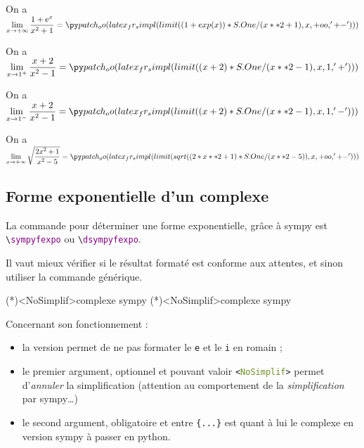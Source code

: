 \documentclass[french,a4paper,11pt]{article}
\newcommand\Cle[1]{{\bfseries\sffamily\textlangle #1\textrangle}}
\begin{document}
\begin{bloctext}
On a $\lim\limits_{x \to +\infty} \dfrac{1+\e^x}{x^2+1} = \sympylim{(1+exp(x))/(x**2+1)}{+oo}$
\end{bloctext}

\begin{bloctext}
On a $\lim\limits_{x \to 1^+} \dfrac{x+2}{x^2-1} = \sympylim{(x+2)/(x**2-1)}{1}[d]$

On a $\lim\limits_{x \to 1^-} \dfrac{x+2}{x^2-1} = \sympylim{(x+2)/(x**2-1)}{1}[g]$
\end{bloctext}

\begin{bloctext}
On a $\lim\limits_{x \to +\infty} \sqrt{\dfrac{2x^2+1}{x^2-5}} = \sympylim{sqrt((2*x**2+1)/(x**2-5))}{+oo}$
\end{bloctext}

\subsection{Forme exponentielle d'un complexe}

\begin{cautionblock}
La commande pour déterminer une forme exponentielle, grâce à \textsf{sympy} est \texttt{\textbackslash \textcolor{purple}{sympyfexpo}} ou \texttt{\textbackslash \textcolor{purple}{dsympyfexpo}}.

Il vaut mieux vérifier si le résultat formaté est conforme aux attentes, et sinon utiliser la commande générique.
\end{cautionblock}

\begin{bloctext}
\sympyfexpo(*)<NoSimplif>{complexe sympy}
\dsympyfexpo(*)<NoSimplif>{complexe sympy}
\end{bloctext}

\begin{tipblock}
Concernant son fonctionnement :

\begin{itemize}
	\item la version \Cle{*} permet de ne pas formater le \texttt{e} et le \texttt{i} en \textsf{romain} ;
	\item le premier argument, optionnel et pouvant valoir \texttt{<\textcolor{OliveDrab}{NoSimplif}>} permet d'\textit{annuler} la simplification (attention au comportement de la \textit{simplification} par \textsf{sympy}\ldots)
	\item le second argument, obligatoire et entre \texttt{\{...\}} est quant à lui le complexe en version \textsf{sympy} à passer en \textsf{python}.
\end{itemize}
\vspace*{-\baselineskip}\leavevmode
\end{tipblock}
\end{document}
